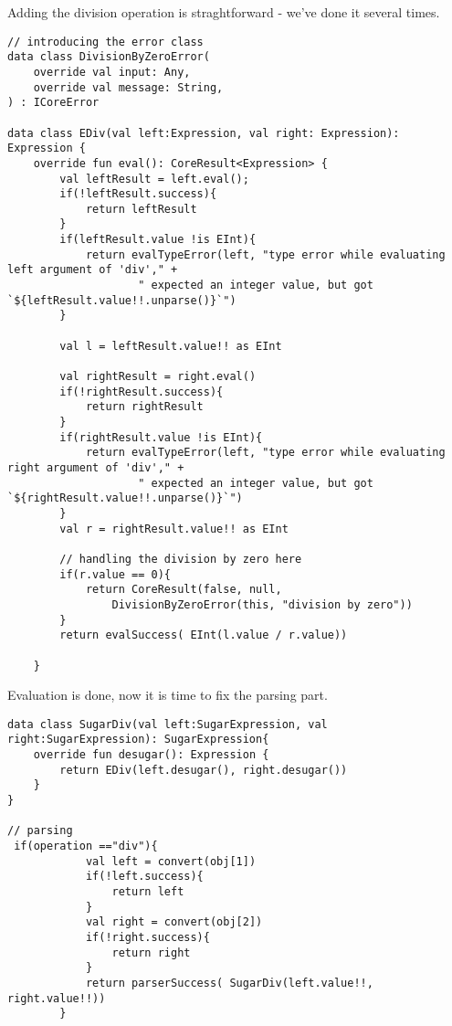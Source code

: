 \documentclass[11pt]{article}
\begin{document}
Adding the division operation is straghtforward - we've done it several times.

\begin{verbatim}
// introducing the error class
data class DivisionByZeroError(
    override val input: Any,
    override val message: String,
) : ICoreError

data class EDiv(val left:Expression, val right: Expression): Expression {
    override fun eval(): CoreResult<Expression> {
        val leftResult = left.eval();
        if(!leftResult.success){
            return leftResult
        }
        if(leftResult.value !is EInt){
            return evalTypeError(left, "type error while evaluating left argument of 'div'," +
                    " expected an integer value, but got `${leftResult.value!!.unparse()}`")
        }

        val l = leftResult.value!! as EInt

        val rightResult = right.eval()
        if(!rightResult.success){
            return rightResult
        }
        if(rightResult.value !is EInt){
            return evalTypeError(left, "type error while evaluating right argument of 'div'," +
                    " expected an integer value, but got `${rightResult.value!!.unparse()}`")
        }
        val r = rightResult.value!! as EInt

        // handling the division by zero here
        if(r.value == 0){
            return CoreResult(false, null,
                DivisionByZeroError(this, "division by zero"))
        }
        return evalSuccess( EInt(l.value / r.value))

    }

\end{verbatim}

Evaluation is done, now it is time to fix the parsing part.
\begin{verbatim}
data class SugarDiv(val left:SugarExpression, val right:SugarExpression): SugarExpression{
    override fun desugar(): Expression {
        return EDiv(left.desugar(), right.desugar())
    }
}

// parsing
 if(operation =="div"){
            val left = convert(obj[1])
            if(!left.success){
                return left
            }
            val right = convert(obj[2])
            if(!right.success){
                return right
            }
            return parserSuccess( SugarDiv(left.value!!, right.value!!))
        }
\end{verbatim}
\end{document}
